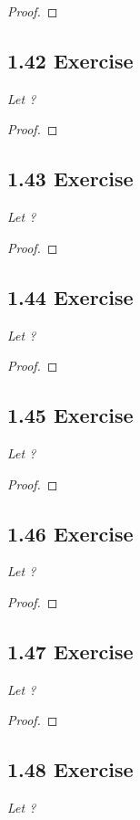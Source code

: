 \documentclass{article}
\begin{document}
\begin{proof}
\end{proof}

\subsection*{1.42 Exercise} 
\quad \textit{Let ?}

\begin{proof}
\end{proof}

\subsection*{1.43 Exercise} 
\quad \textit{Let ?}

\begin{proof}
\end{proof}

\subsection*{1.44 Exercise} 
\quad \textit{Let ?}

\begin{proof}
\end{proof}

\subsection*{1.45 Exercise} 
\quad \textit{Let ?}

\begin{proof}
\end{proof}

\subsection*{1.46 Exercise} 
\quad \textit{Let ?}

\begin{proof}
\end{proof}

\subsection*{1.47 Exercise} 
\quad \textit{Let ?}

\begin{proof}
\end{proof}

\subsection*{1.48 Exercise} 
\quad \textit{Let ?}
\end{document}
